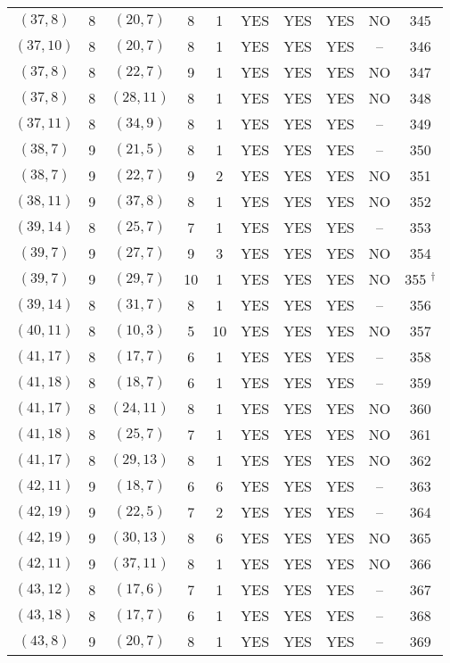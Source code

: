 \begin{longtable}{|c|c|c|c|c|c|c|c|c|c|}
$(37, 8)$ & 8 & $(20, 7)$ & 8 & 1 & YES & YES & YES & NO & 345\\
$(37, 10)$ & 8 & $(20, 7)$ & 8 & 1 & YES & YES & YES & -- & 346\\
$(37, 8)$ & 8 & $(22, 7)$ & 9 & 1 & YES & YES & YES & NO & 347\\
$(37, 8)$ & 8 & $(28, 11)$ & 8 & 1 & YES & YES & YES & NO & 348\\
$(37, 11)$ & 8 & $(34, 9)$ & 8 & 1 & YES & YES & YES & -- & 349\\
$(38, 7)$ & 9 & $(21, 5)$ & 8 & 1 & YES & YES & YES & -- & 350\\
$(38, 7)$ & 9 & $(22, 7)$ & 9 & 2 & YES & YES & YES & NO & 351\\
$(38, 11)$ & 9 & $(37, 8)$ & 8 & 1 & YES & YES & YES & NO & 352\\
$(39, 14)$ & 8 & $(25, 7)$ & 7 & 1 & YES & YES & YES & -- & 353\\
$(39, 7)$ & 9 & $(27, 7)$ & 9 & 3 & YES & YES & YES & NO & 354\\
$(39, 7)$ & 9 & $(29, 7)$ & 10 & 1 & YES & YES & YES & NO & 355 ${}^\dagger$\\
$(39, 14)$ & 8 & $(31, 7)$ & 8 & 1 & YES & YES & YES & -- & 356\\
$(40, 11)$ & 8 & $(10, 3)$ & 5 & 10 & YES & YES & YES & NO & 357\\
$(41, 17)$ & 8 & $(17, 7)$ & 6 & 1 & YES & YES & YES & -- & 358\\
$(41, 18)$ & 8 & $(18, 7)$ & 6 & 1 & YES & YES & YES & -- & 359\\
$(41, 17)$ & 8 & $(24, 11)$ & 8 & 1 & YES & YES & YES & NO & 360\\
$(41, 18)$ & 8 & $(25, 7)$ & 7 & 1 & YES & YES & YES & NO & 361\\
$(41, 17)$ & 8 & $(29, 13)$ & 8 & 1 & YES & YES & YES & NO & 362\\
$(42, 11)$ & 9 & $(18, 7)$ & 6 & 6 & YES & YES & YES & -- & 363\\
$(42, 19)$ & 9 & $(22, 5)$ & 7 & 2 & YES & YES & YES & -- & 364\\
$(42, 19)$ & 9 & $(30, 13)$ & 8 & 6 & YES & YES & YES & NO & 365\\
$(42, 11)$ & 9 & $(37, 11)$ & 8 & 1 & YES & YES & YES & NO & 366\\
$(43, 12)$ & 8 & $(17, 6)$ & 7 & 1 & YES & YES & YES & -- & 367\\
$(43, 18)$ & 8 & $(17, 7)$ & 6 & 1 & YES & YES & YES & -- & 368\\
$(43, 8)$ & 9 & $(20, 7)$ & 8 & 1 & YES & YES & YES & -- & 369\\

\end{longtable}
